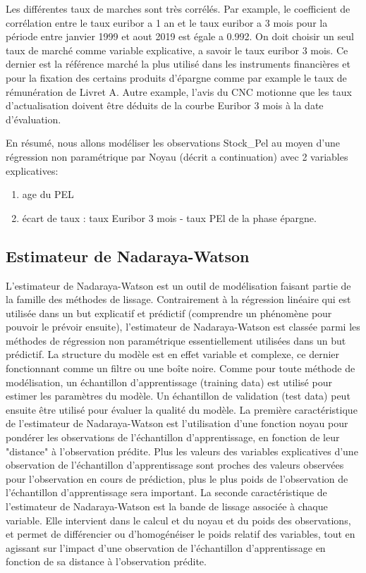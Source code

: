 \documentclass[12pt, a4paper]{book}
\begin{document}
Les différentes taux de marches sont très corrélés. Par example, le coefficient de corrélation entre le taux euribor a 1 an et le taux euribor a 3 mois pour la période entre janvier 1999 et aout 2019 est égale a 0.992. On doit choisir un seul taux de marché comme variable explicative, a savoir le taux euribor 3 mois. Ce dernier est la référence marché la plus utilisé dans les instruments financières et pour la fixation des certains produits d'épargne comme par example le taux de rémunération de Livret A. Autre example, l'avis \cite{CNC1} du CNC motionne que les taux d'actualisation doivent être déduits de la courbe Euribor 3 mois à la date d'évaluation. 

En résumé, nous allons modéliser les observations Stock\_Pel au moyen d'une régression non paramétrique par Noyau (décrit a continuation) avec 2 variables explicatives:
\begin{enumerate}
\item age du PEL
\item écart de taux : taux Euribor 3 mois - taux PEl de la phase épargne.
\end{enumerate}

\subsection{Estimateur de Nadaraya-Watson}

L'estimateur  de Nadaraya-Watson est un outil de modélisation faisant partie de la famille des méthodes  de lissage. Contrairement à la régression linéaire qui est utilisée dans un but explicatif et prédictif (comprendre un phénomène pour pouvoir le prévoir ensuite), l'estimateur  de Nadaraya-Watson est classée parmi les méthodes de régression non paramétrique essentiellement utilisées dans un but prédictif. La structure du modèle est en effet variable et complexe, ce dernier fonctionnant comme un filtre ou une boîte noire. 
Comme pour toute méthode de modélisation, un échantillon d'apprentissage (training data) est utilisé pour estimer les paramètres du modèle. Un échantillon de validation (test data) peut ensuite être utilisé pour évaluer la qualité du modèle. 
La première caractéristique de l'estimateur  de Nadaraya-Watson est l'utilisation d'une fonction noyau pour pondérer les observations de l'échantillon d'apprentissage, en fonction de leur "distance" à l'observation prédite. Plus les valeurs des variables explicatives d'une observation de l'échantillon d'apprentissage sont proches des valeurs observées pour l'observation en cours de prédiction, plus le plus poids de l'observation de l'échantillon d'apprentissage sera important. 
La seconde caractéristique de l'estimateur  de Nadaraya-Watson est la bande de lissage associée à chaque variable. Elle intervient dans le calcul et du noyau et du poids des observations, et permet de différencier ou d'homogénéiser le poids relatif des variables, tout en agissant sur l'impact d'une observation de l'échantillon d'apprentissage en fonction de sa distance à l'observation prédite.
\end{document}
